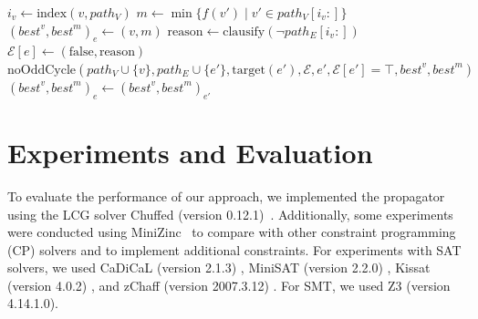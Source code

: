 \documentclass[a4paper,UKenglish,cleveref, autoref, thm-restate, anonymous]{lipics-v2021}
\begin{document}
\begin{algorithm}
    \caption{Implementation of \noc as filter remembering best payoffs ($\mathsf{Memo}$)}
    \small
    \begin{algorithmic}[1]


            \State $i_v \gets \text{index}(v, path_V)$
            \State $m \gets \min\{f(v') \mid v' \in path_V[i_v:]\}$
            \State $(\textit{best}^v,\textit{best}^m)_e \gets (v,m)$ \label{alg:no-odd-cycle-f3:update}
                \State $\text{reason} \gets \text{clausify}(\neg path_E[i_v:])$
                \State $\mathcal{E}[e] \gets (\text{false}, \text{reason})$
            \EndIf
        \Else 
                     \label{alg:no-odd-cycle-f3:check}
                        \State $\text{noOddCycle}(path_V \cup \{v\}, path_E \cup \{e'\}, \text{target}(e'), \mathcal{E}, e', \mathcal{E}[e'] = \top, \textit{best}^v,\textit{best}^m)$
                    \Else
                            \State $(\textit{best}^v,\textit{best}^m)_e \gets (\textit{best}^v,\textit{best}^m)_{e'}$
                    \EndIf
                \EndFor
            \EndIf
        \EndIf    
    
    \EndFunction
    \end{algorithmic}
    \label{alg:no-odd-cycle-f3}
\end{algorithm}

\section{Experiments and Evaluation}\label{sec:experiments}

To evaluate the performance of our approach, we implemented the \noc propagator using the LCG solver Chuffed (version 0.12.1)~\cite{chuffed:2018}. Additionally, some experiments were conducted using MiniZinc~\cite{DBLP:conf/cp/NethercoteSBBDT07} to compare with other constraint programming (CP) solvers and to implement additional constraints. For experiments with SAT solvers, we used CaDiCaL (version 2.1.3) \cite{Biere:Cadical:2024}, MiniSAT (version 2.2.0) \cite{Een:MiniSat:2003}, Kissat (version 4.0.2) \cite{Biere:Kissat:2024}, and zChaff (version 2007.3.12) \cite{Moskewicz:zChaff:2001}. For SMT, we used Z3 (version 4.14.1.0).
\end{document}
